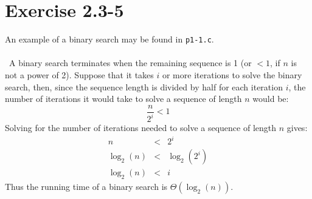 \documentclass{article}
\begin{document}
\section*{Exercise 2.3-5}

An example of a binary search may be found in \texttt{p1-1.c}.
\\ \\
\noindent~A binary search terminates when the remaining sequence is 1 (or $< 1$, if $n$ is not a power of 2). Suppose that it takes $i$ or more iterations to solve the binary search, then, since the sequence length is divided by half for each iteration $i$, the number of iterations it would take to solve a sequence of length $n$ would be:
\begin{equation*}
	\frac{n}{2^i} < 1
\end{equation*}
Solving for the number of iterations needed to solve a sequence of length $n$ gives:
\begin{eqnarray*}
	n & < & 2^i \\
	\log_2(n) & < & \log_2(2^i) \\
	\log_2(n) & < & i
\end{eqnarray*}
Thus the running time of a binary search is $\Theta(\log_2(n))$.
\end{document}
